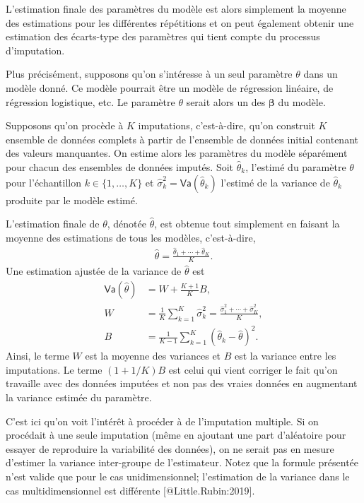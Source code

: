 \documentclass[
  11pt,
  letterpaper,
]{scrbook}
\theoremstyle{definition}
\theoremstyle{remark}
\begin{document}
L'estimation finale des paramètres du modèle est alors simplement la
moyenne des estimations pour les différentes répétitions et on peut
également obtenir une estimation des écarts-type des paramètres qui
tient compte du processus d'imputation.

Plus précisément, supposons qu'on s'intéresse à un seul paramètre
\(\theta\) dans un modèle donné. Ce modèle pourrait être un modèle de
régression linéaire, de régression logistique, etc. Le paramètre
\(\theta\) serait alors un des \(\boldsymbol{\beta}\) du modèle.

Supposons qu'on procède à \(K\) imputations, c'est-à-dire, qu'on
construit \(K\) ensemble de données complets à partir de l'ensemble de
données initial contenant des valeurs manquantes. On estime alors les
paramètres du modèle séparément pour chacun des ensembles de données
imputés. Soit \(\widehat{\theta}_k\), l'estimé du paramètre \(\theta\)
pour l'échantillon \(k \in \{1, \ldots, K\}\) et
\(\widehat{\sigma}_k^2=\mathsf{Va}(\widehat{\theta}_k)\) l'estimé de la
variance de \(\widehat{\theta}_k\) produite par le modèle estimé.

L'estimation finale de \(\theta\), dénotée \(\widehat{\theta}\), est
obtenue tout simplement en faisant la moyenne des estimations de tous
les modèles, c'est-à-dire, \begin{align*}
\widehat{\theta} = \frac{\widehat{\theta}_1 + \cdots + \widehat{\theta}_K}{K}.
\end{align*} Une estimation ajustée de la variance de
\(\widehat{\theta}\) est \begin{align*}
\mathsf{Va}(\hat{\theta}) &= W+ \frac{K+1}{K}B, 
\\ W &= \frac{1}{K} \sum_{k=1}^K \widehat{\sigma}^2_k = \frac{\widehat{\sigma}_1^2 + \cdots + \widehat{\sigma}_K^2}{K},\\
B &= \frac{1}{K-1} \sum_{k=1}^K (\widehat{\theta}_k - \widehat{\theta})^2.
\end{align*} Ainsi, le terme \(W\) est la moyenne des variances et \(B\)
est la variance entre les imputations. Le terme \((1+1/K)B\) est celui
qui vient corriger le fait qu'on travaille avec des données imputées et
non pas des vraies données en augmentant la variance estimée du
paramètre.

C'est ici qu'on voit l'intérêt à procéder à de l'imputation multiple. Si
on procédait à une seule imputation (même en ajoutant une part
d'aléatoire pour essayer de reproduire la variabilité des données), on
ne serait pas en mesure d'estimer la variance inter-groupe de
l'estimateur. Notez que la formule présentée n'est valide que pour le
cas unidimensionnel; l'estimation de la variance dans le cas
multidimensionnel est différente {[}@Little.Rubin:2019{]}.
\end{document}
